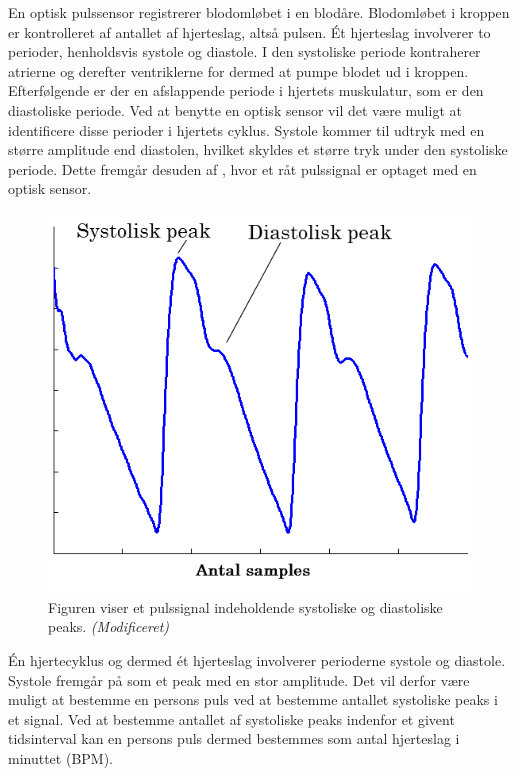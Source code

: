 En optisk pulssensor registrerer blodomløbet i en blodåre. Blodomløbet i kroppen er kontrolleret af antallet af hjerteslag, altså pulsen. Ét hjerteslag involverer to perioder, henholdsvis systole og diastole. I den systoliske periode kontraherer atrierne og derefter ventriklerne for dermed at pumpe blodet ud i kroppen. Efterfølgende er der en afslappende periode i hjertets muskulatur, som er den diastoliske periode. \newline
Ved at benytte en optisk sensor vil det være muligt at identificere disse perioder i hjertets cyklus. Systole kommer til udtryk med en større amplitude end diastolen, hvilket skyldes et større tryk under den systoliske periode. Dette fremgår desuden af , hvor et råt pulssignal er optaget med en optisk sensor. \citep{Martini2012}
\begin{figure}[H]
	\centering
	\includegraphics[scale=0.54]{figures/cDesign/puls_goldenstand.png}
	\caption{Figuren viser et pulssignal indeholdende systoliske og diastoliske peaks. \citep{GanZahedi2011} \textit{(Modificeret)}}
	\label{fig:puls_goldenstand}
\end{figure}
Én hjertecyklus og dermed ét hjerteslag involverer perioderne systole og diastole. Systole fremgår på  som et peak med en stor amplitude. Det vil derfor være muligt at bestemme en persons puls ved at bestemme antallet systoliske peaks i et signal. Ved at bestemme antallet af systoliske peaks indenfor et givent tidsinterval kan en persons puls dermed bestemmes som antal hjerteslag i minuttet (BPM).


